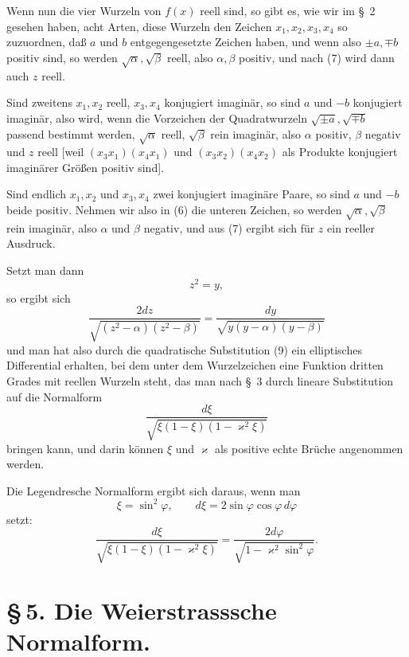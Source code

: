 \documentclass[11pt]{article}
\begin{document}
Wenn nun die vier Wurzeln von $f(x)$ reell sind, so gibt es, wie wir im \S~2 gesehen haben, acht Arten, diese Wurzeln den Zeichen $x_1,x_2,x_3,x_4$ so zuzuordnen, daß $a$ und $b$ entgegengesetzte Zeichen haben, und wenn also $\pm a,\mp b$ positiv sind, so werden $\sqrt{\alpha},\sqrt{\beta}$ reell, also $\alpha,\beta$ positiv, und nach (7) wird dann auch $z$ reell.

Sind zweitens $x_1,x_2$ reell, $x_3,x_4$ konjugiert imaginär, so sind $a$ und $-b$ konjugiert imaginär, also wird, wenn die Vorzeichen der Quadratwurzeln $\sqrt{\pm a},\sqrt{\mp b}$ passend bestimmt werden, $\sqrt{\alpha}$ reell, $\sqrt{\beta}$ rein imaginär, also $\alpha$ positiv, $\beta$ negativ und $z$ reell [weil $(x_3x_1)(x_4x_1)$ und $(x_3x_2)(x_4x_2)$ als Produkte konjugiert imaginärer Größen positiv sind].

Sind endlich $x_1,x_2$ und $x_3,x_4$ zwei konjugiert imaginäre Paare, so sind $a$ und $-b$ beide positiv. Nehmen wir also in (6) die unteren Zeichen, so werden $\sqrt{\alpha},\sqrt{\beta}$ rein imaginär, also $\alpha$ und $\beta$ negativ, und aus (7) ergibt sich für $z$ ein reeller Ausdruck.

Setzt man dann
\begin{equation}
z^2=y,
\tag{9}
\end{equation}
so ergibt sich
\begin{equation}
\frac{2dz}{\sqrt{(z^2-\alpha)(z^2-\beta)}}=
\frac{dy}{\sqrt{y(y-\alpha)(y-\beta)}}
\tag{10}
\end{equation}
und man hat also durch die quadratische Substitution (9) ein elliptisches Differential erhalten, bei dem unter dem Wurzelzeichen eine Funktion dritten Grades mit reellen Wurzeln steht, das man nach \S~3 durch lineare Substitution auf die Normalform
\[
\frac{d\xi}{\sqrt{\xi(1-\xi)(1-\varkappa^2\xi)}}
\]
bringen kann, und darin können $\xi$ und $\varkappa$ als positive echte Brüche angenommen werden.

Die Legendresche Normalform ergibt sich daraus, wenn man
\[
\xi=\sin^2\varphi,\qquad d\xi=2\sin\varphi\cos\varphi\,d\varphi
\]
setzt:
\begin{equation}
\frac{d\xi}{\sqrt{\xi(1-\xi)(1-\varkappa^2\xi)}}=
\frac{2d\varphi}{\sqrt{1-\varkappa^2\sin^2\varphi}}.
\tag{11}
\end{equation}

\section*{\S\,5. Die Weierstrasssche Normalform.}
\end{document}

